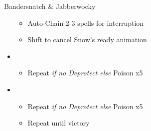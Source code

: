 \begin{battle}[0:55]{Bandersnatch \& Jabberwocky}
\begin{itemize}
\begin{itemize}
				      \item Auto-Chain 2-3 spells for interruption
				      \item Shift to cancel Snow's ready animation
			      \end{itemize}
			\item \fifth
			      \begin{itemize}
				      \item Repeat \textit{if no Deprotect else } Poison x5
			      \end{itemize}
			\item \second
			      \begin{itemize}
				      \item Repeat \textit{if no Deprotect else }Poison x5
				      \item Repeat until victory
			      \end{itemize}
		\end{itemize}
	\end{battle}

